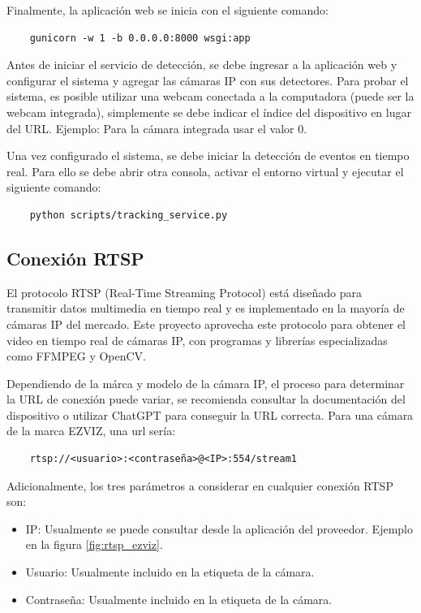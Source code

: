 \documentclass[11pt,a4paper]{article}
\begin{document}
Finalmente, la aplicación web se inicia con el siguiente comando:

\begin{verbatim}
    gunicorn -w 1 -b 0.0.0.0:8000 wsgi:app
\end{verbatim}

Antes de iniciar el servicio de detección, se debe ingresar a la aplicación web y configurar el sistema y agregar las cámaras IP con sus detectores. Para probar el sistema, es posible utilizar una webcam conectada a la computadora (puede ser la webcam integrada), simplemente se debe indicar el índice del dispositivo en lugar del URL. Ejemplo: Para la cámara integrada usar el valor 0.

Una vez configurado el sistema, se debe iniciar la detección de eventos en tiempo real. Para ello se debe abrir otra consola, activar el entorno virtual y ejecutar el siguiente comando:

\begin{verbatim}
    python scripts/tracking_service.py
\end{verbatim}

\subsection{Conexión RTSP}

El protocolo RTSP (Real-Time Streaming Protocol) está diseñado para transmitir datos multimedia en tiempo real y es implementado en la mayoría de cámaras IP del mercado. Este proyecto aprovecha este protocolo para obtener el video en tiempo real de cámaras IP, con programas y librerías especializadas como FFMPEG y OpenCV.

Dependiendo de la márca y modelo de la cámara IP, el proceso para determinar la URL de conexión puede variar, se recomienda consultar la documentación del dispositivo o utilizar ChatGPT para conseguir la URL correcta. Para una cámara de la marca EZVIZ, una url sería:

\begin{verbatim}
    rtsp://<usuario>:<contraseña>@<IP>:554/stream1
\end{verbatim}

Adicionalmente, los tres parámetros a considerar en cualquier conexión RTSP son:

\begin{itemize}
    \item IP: Usualmente se puede consultar desde la aplicación del proveedor. Ejemplo en la figura \ref{fig:rtsp_ezviz}.
    \item Usuario: Usualmente incluido en la etiqueta de la cámara.
    \item Contraseña: Usualmente incluido en la etiqueta de la cámara.
\end{itemize}
\end{document}
